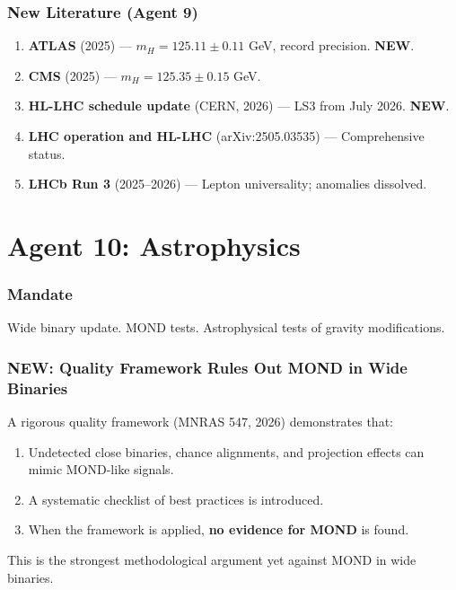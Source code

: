 \documentclass[11pt,a4paper]{article}
\newcommand{\NEW}{\textcolor{dfdblue}{\textbf{NEW}}}
\begin{document}
\section{New Literature (Agent 9)}

\begin{enumerate}
\item \textbf{ATLAS} (2025) --- $m_H = 125.11 \pm 0.11$ GeV, record precision. \NEW.
\item \textbf{CMS} (2025) --- $m_H = 125.35 \pm 0.15$ GeV.
\item \textbf{HL-LHC schedule update} (CERN, 2026) --- LS3 from July 2026. \NEW.
\item \textbf{LHC operation and HL-LHC} (arXiv:2505.03535) --- Comprehensive status.
\item \textbf{LHCb Run 3} (2025--2026) --- Lepton universality; anomalies dissolved.
\end{enumerate}


\part{Agent 10: Astrophysics}
\label{part:agent10}

\section{Mandate}

Wide binary update. MOND tests. Astrophysical tests of gravity modifications.

\section{\NEW: Quality Framework Rules Out MOND in Wide Binaries}

\begin{tcolorbox}[colback=blue!5!white, colframe=blue!60!black,
  title={MNRAS (2026): Quality Framework for Wide Binary Gravity Tests}]
A rigorous quality framework (MNRAS 547, 2026) demonstrates that:
\begin{enumerate}
\item Undetected close binaries, chance alignments, and projection effects can mimic MOND-like signals.
\item A systematic checklist of best practices is introduced.
\item When the framework is applied, \textbf{no evidence for MOND} is found.
\end{enumerate}

This is the strongest methodological argument yet against MOND in wide binaries.
\end{tcolorbox}
\end{document}
